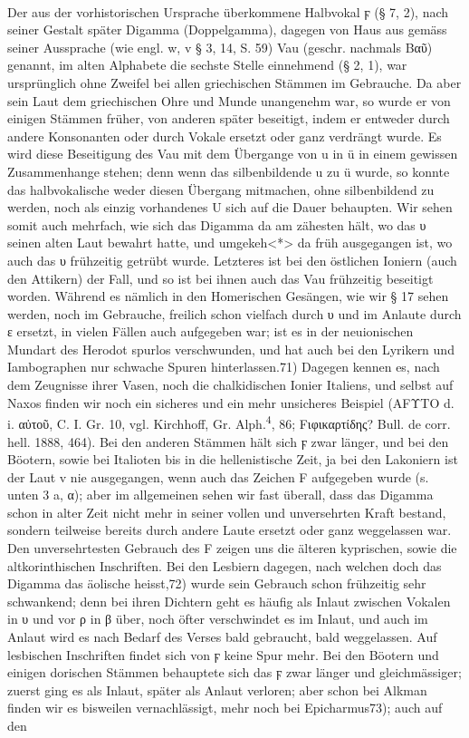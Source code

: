 \paragraph{} Der aus der vorhistorischen Ursprache überkommene Halbvokal ϝ (§ 7, 2), nach seiner Gestalt später Digamma (Doppelgamma), dagegen von Haus aus gemäss seiner Aussprache (wie engl. w,  v § 3, 14, S. 59) Vau (geschr. nachmals Βαῦ) genannt, im alten Alphabete die sechste Stelle einnehmend (§ 2, 1), war ursprünglich ohne Zweifel bei allen griechischen Stämmen im Gebrauche. Da aber sein Laut dem griechischen Ohre und Munde unangenehm war, so wurde er von einigen Stämmen früher, von anderen später beseitigt, indem er entweder durch andere Konsonanten oder durch Vokale ersetzt oder ganz verdrängt wurde. Es wird diese Beseitigung des Vau mit dem Übergange von u in ü in einem gewissen Zusammenhange stehen; denn wenn das silbenbildende u zu ü wurde, so konnte das halbvokalische weder diesen Übergang mitmachen, ohne silbenbildend zu werden, noch als einzig vorhandenes U sich auf die Dauer behaupten. Wir sehen somit auch mehrfach, wie sich das Digamma da am zähesten hält, wo das υ seinen alten Laut bewahrt hatte, und umgekeh<*> da früh ausgegangen ist, wo auch das υ frühzeitig getrübt wurde. Letzteres ist bei den östlichen Ioniern (auch den Attikern) der Fall, und so ist bei ihnen auch das Vau frühzeitig beseitigt worden. Während es nämlich in den Homerischen Gesängen, wie wir § 17 sehen werden, noch im Gebrauche, freilich schon vielfach durch υ und im Anlaute durch ε ersetzt, in vielen Fällen auch aufgegeben war; ist es in der neuionischen Mundart des Herodot spurlos verschwunden, und hat auch bei den Lyrikern und Iambographen nur schwache Spuren hinterlassen.71) Dagegen kennen es, nach dem Zeugnisse ihrer Vasen, noch die chalkidischen Ionier Italiens, und selbst auf Naxos finden wir noch ein sicheres und ein mehr unsicheres Beispiel (ΑFΥΤΟ d. i. αὐτοῦ, C. I. Gr. 10, vgl. Kirchhoff, Gr. Alph.\textsuperscript{4}, 86; Fιφικαρτίδης? Bull. de corr. hell. 1888, 464). Bei den anderen Stämmen hält sich ϝ zwar länger, und bei den Böotern, sowie bei Italioten bis in die hellenistische Zeit, ja bei den Lakoniern ist der Laut v nie ausgegangen, wenn auch das Zeichen F aufgegeben wurde (s. unten 3 a, α); aber im allgemeinen sehen wir fast überall, dass das Digamma schon in alter Zeit nicht mehr in seiner vollen und unversehrten Kraft bestand, sondern teilweise bereits durch andere Laute ersetzt oder ganz weggelassen war. Den unversehrtesten Gebrauch des F zeigen uns die älteren kyprischen, sowie die altkorinthischen Inschriften. Bei den Lesbiern dagegen, nach welchen doch das Digamma das äolische heisst,72) wurde sein Gebrauch schon frühzeitig sehr schwankend; denn bei ihren Dichtern geht es häufig als Inlaut zwischen Vokalen in υ und vor ρ in β über, noch öfter verschwindet es im Inlaut, und auch im Anlaut wird es nach Bedarf des Verses bald gebraucht, bald weggelassen. Auf lesbischen Inschriften findet sich von ϝ keine Spur mehr. Bei den Böotern und einigen dorischen Stämmen behauptete sich das ϝ zwar länger und gleichmässiger; zuerst ging es als Inlaut, später als Anlaut verloren; aber schon bei Alkman finden wir es bisweilen vernachlässigt, mehr noch bei Epicharmus73); auch auf den 